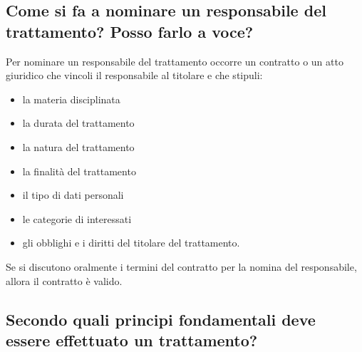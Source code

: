 \subsection{Come si fa a nominare un responsabile del trattamento? Posso farlo a voce?}
Per nominare un responsabile del trattamento occorre un contratto o un atto
giuridico che vincoli il responsabile al titolare e che stipuli:
\begin{itemize}
    \item la materia disciplinata
    \item la durata del trattamento
    \item la natura del trattamento
    \item la finalità del trattamento
    \item il tipo di dati personali
    \item le categorie di interessati
    \item gli obblighi e i diritti del titolare del trattamento.
\end{itemize}
Se si discutono oralmente i termini del contratto per la nomina del responsabile, allora il contratto è valido.

\subsection{Secondo quali principi fondamentali deve essere effettuato un trattamento?}
\label{sec:principi}

